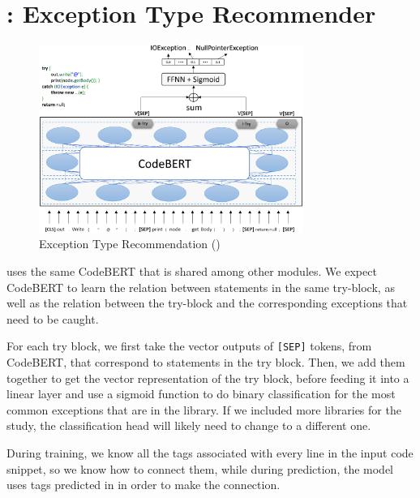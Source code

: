 \section{{\xtype}: Exception Type Recommender}
\label{sec:xtype}

\begin{figure}[t]
\begin{center}
\includegraphics[width=3.4in]{xtype-4.png}
\vspace{-10pt}
\caption{Exception Type Recommendation ({\xtype})}
\label{fig:xtype}
\end{center}
\end{figure}

{\xtype} uses the same CodeBERT that is shared  among other modules. We expect CodeBERT to learn the relation between statements in the same try-block, 
as well as the relation between the try-block and the corresponding exceptions that need to be caught. 

For each try block, we first take the vector outputs of \texttt{[SEP]} tokens, from CodeBERT, that correspond to statements in the try block. Then, we add them together 
to get the vector representation of the try block, before feeding it into a linear layer and use a sigmoid function to do binary classification for the most common exceptions
that are in the library. If we included more libraries for the study, the classification head will likely need to change to a different one.

During training, we know all the tags associated with every line in the input code snippet, so we know how to connect them, while during prediction, the model uses tags predicted in {\xstate} in order to make the connection.



